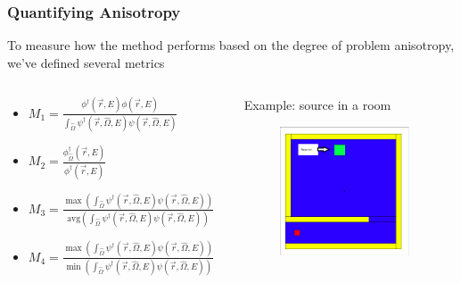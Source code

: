 \documentclass[xcolor=x11names,compress]{beamer}
\renewcommand{\(}{\begin{columns}}
\renewcommand{\)}{\end{columns}}
\newcommand{\<}[1]{\begin{column}{#1}}
\renewcommand{\>}{\end{column}}
\newcommand{\vOmega}{\ensuremath{\hat{\Omega}}}
\newcommand{\vecr}{\vec{r}}
\begin{document}
\begin{frame}[fragile]

  \frametitle{Quantifying Anisotropy}
  
  To measure how the method performs based on the degree of problem anisotropy, we've defined several metrics
  \vspace*{1em}
    \begin{columns}
    \begin{column}{0.5\textwidth}
      \begin{itemize}
      \item $M_{1} = \frac{\phi^{\dagger}(\vecr,E)\phi(\vecr,E)}{\int_{\vOmega}\psi^{\dagger}(\vecr,\vOmega,E)\psi(\vecr,\vOmega,E)}$
      \item $M_{2} = \frac{\phi^{\dagger}_{\vOmega}(\vecr,E)}{\phi^{\dagger}(\vecr,E)}$
      \item $M_{3} = \frac{\max(\int_{\vOmega}\psi^{\dagger}(\vecr,\vOmega,E)\psi(\vecr,\vOmega,E))}{\text{avg}(\int_{\vOmega}\psi^{\dagger}(\vecr,\vOmega,E)\psi(\vecr,\vOmega,E))}$
       \item $M_{4} = \frac{\max(\int_{\vOmega}\psi^{\dagger}(\vecr,\vOmega,E)\psi(\vecr,\vOmega,E))}{\min(\int_{\vOmega}\psi^{\dagger}(\vecr,\vOmega,E)\psi(\vecr,\vOmega,E))}$
      \end{itemize}
    \end{column}    
    \begin{column}{0.5\textwidth}
    Example: source in a room
      	\begin{figure}
  	\begin{center}
  		\includegraphics[height=1.5in,clip]{../figs/therapy-room.png}
	\end{center}
  	\end{figure}
    \end{column}
  \end{columns}   

\end{frame}
\end{document}
